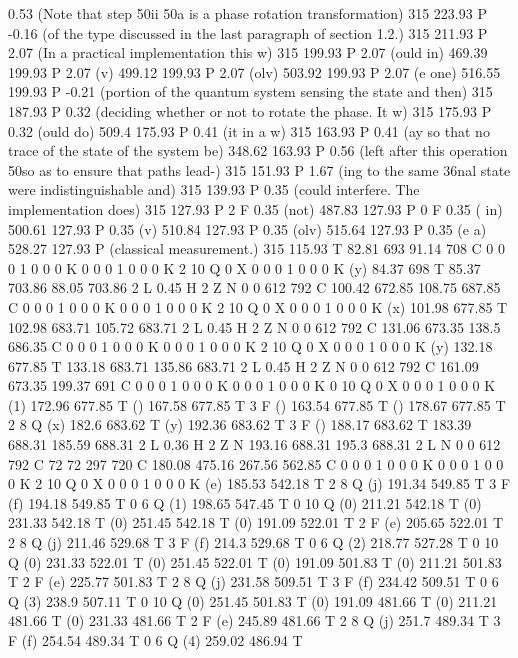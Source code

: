 0.53 (Note that step \050ii \050a is a phase rotation transformation) 315 223.93 P
-0.16 (of the type discussed in the last paragraph of section 1.2.) 315 211.93 P
2.07 (In a practical implementation this w) 315 199.93 P
2.07 (ould in) 469.39 199.93 P
2.07 (v) 499.12 199.93 P
2.07 (olv) 503.92 199.93 P
2.07 (e one) 516.55 199.93 P
-0.21 (portion of the quantum system sensing the state and then) 315 187.93 P
0.32 (deciding whether or not to rotate the phase. It w) 315 175.93 P
0.32 (ould do) 509.4 175.93 P
0.41 (it in a w) 315 163.93 P
0.41 (ay so that no trace of the state of the system be) 348.62 163.93 P
0.56 (left after this operation \050so as to ensure that paths lead-) 315 151.93 P
1.67 (ing to the same \336nal state were indistinguishable and) 315 139.93 P
0.35 (could interfere. The implementation does) 315 127.93 P
2 F
0.35 (not) 487.83 127.93 P
0 F
0.35 ( in) 500.61 127.93 P
0.35 (v) 510.84 127.93 P
0.35 (olv) 515.64 127.93 P
0.35 (e a) 528.27 127.93 P
(classical measurement.) 315 115.93 T
82.81 693 91.14 708 C
0 0 0 1 0 0 0 K
0 0 0 1 0 0 0 K
2 10 Q
0 X
0 0 0 1 0 0 0 K
(y) 84.37 698 T
85.37 703.86 88.05 703.86 2 L
0.45 H
2 Z
N
0 0 612 792 C
100.42 672.85 108.75 687.85 C
0 0 0 1 0 0 0 K
0 0 0 1 0 0 0 K
2 10 Q
0 X
0 0 0 1 0 0 0 K
(x) 101.98 677.85 T
102.98 683.71 105.72 683.71 2 L
0.45 H
2 Z
N
0 0 612 792 C
131.06 673.35 138.5 686.35 C
0 0 0 1 0 0 0 K
0 0 0 1 0 0 0 K
2 10 Q
0 X
0 0 0 1 0 0 0 K
(y) 132.18 677.85 T
133.18 683.71 135.86 683.71 2 L
0.45 H
2 Z
N
0 0 612 792 C
161.09 673.35 199.37 691 C
0 0 0 1 0 0 0 K
0 0 0 1 0 0 0 K
0 10 Q
0 X
0 0 0 1 0 0 0 K
(1) 172.96 677.85 T
() 167.58 677.85 T
3 F
() 163.54 677.85 T
() 178.67 677.85 T
2 8 Q
(x) 182.6 683.62 T
(y) 192.36 683.62 T
3 F
() 188.17 683.62 T
183.39 688.31 185.59 688.31 2 L
0.36 H
2 Z
N
193.16 688.31 195.3 688.31 2 L
N
0 0 612 792 C
72 72 297 720 C
180.08 475.16 267.56 562.85 C
0 0 0 1 0 0 0 K
0 0 0 1 0 0 0 K
2 10 Q
0 X
0 0 0 1 0 0 0 K
(e) 185.53 542.18 T
2 8 Q
(j) 191.34 549.85 T
3 F
(f) 194.18 549.85 T
0 6 Q
(1) 198.65 547.45 T
0 10 Q
(0) 211.21 542.18 T
(0) 231.33 542.18 T
(0) 251.45 542.18 T
(0) 191.09 522.01 T
2 F
(e) 205.65 522.01 T
2 8 Q
(j) 211.46 529.68 T
3 F
(f) 214.3 529.68 T
0 6 Q
(2) 218.77 527.28 T
0 10 Q
(0) 231.33 522.01 T
(0) 251.45 522.01 T
(0) 191.09 501.83 T
(0) 211.21 501.83 T
2 F
(e) 225.77 501.83 T
2 8 Q
(j) 231.58 509.51 T
3 F
(f) 234.42 509.51 T
0 6 Q
(3) 238.9 507.11 T
0 10 Q
(0) 251.45 501.83 T
(0) 191.09 481.66 T
(0) 211.21 481.66 T
(0) 231.33 481.66 T
2 F
(e) 245.89 481.66 T
2 8 Q
(j) 251.7 489.34 T
3 F
(f) 254.54 489.34 T
0 6 Q
(4) 259.02 486.94 T
